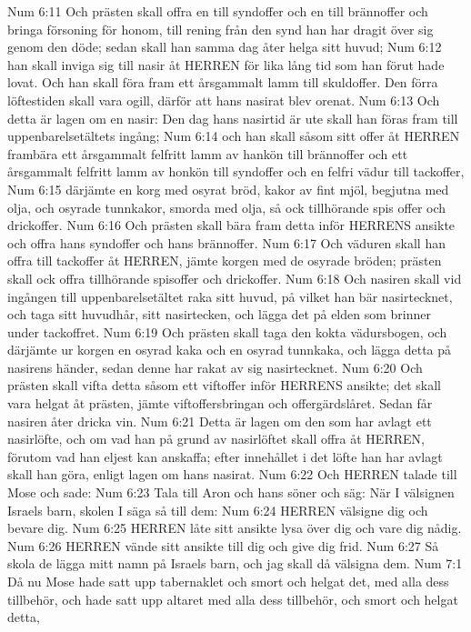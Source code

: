Num 6:11  Och prästen skall offra en till syndoffer och en till brännoffer och bringa försoning för honom, till rening från den synd han har dragit över sig genom den döde; sedan skall han samma dag åter helga sitt huvud;
Num 6:12  han skall inviga sig till nasir åt HERREN för lika lång tid som han förut hade lovat. Och han skall föra fram ett årsgammalt lamm till skuldoffer. Den förra löftestiden skall vara ogill, därför att hans nasirat blev orenat.
Num 6:13  Och detta är lagen om en nasir: Den dag hans nasirtid är ute skall han föras fram till uppenbarelsetältets ingång;
Num 6:14  och han skall såsom sitt offer åt HERREN frambära ett årsgammalt felfritt lamm av hankön till brännoffer och ett årsgammalt felfritt lamm av honkön till syndoffer och en felfri vädur till tackoffer,
Num 6:15  därjämte en korg med osyrat bröd, kakor av fint mjöl, begjutna med olja, och osyrade tunnkakor, smorda med olja, så ock tillhörande spis offer och drickoffer.
Num 6:16  Och prästen skall bära fram detta inför HERRENS ansikte och offra hans syndoffer och hans brännoffer.
Num 6:17  Och väduren skall han offra till tackoffer åt HERREN, jämte korgen med de osyrade bröden; prästen skall ock offra tillhörande spisoffer och drickoffer.
Num 6:18  Och nasiren skall vid ingången till uppenbarelsetältet raka sitt huvud, på vilket han bär nasirtecknet, och taga sitt huvudhår, sitt nasirtecken, och lägga det på elden som brinner under tackoffret.
Num 6:19  Och prästen skall taga den kokta vädursbogen, och därjämte ur korgen en osyrad kaka och en osyrad tunnkaka, och lägga detta på nasirens händer, sedan denne har rakat av sig nasirtecknet.
Num 6:20  Och prästen skall vifta detta såsom ett viftoffer inför HERRENS ansikte; det skall vara helgat åt prästen, jämte viftoffersbringan och offergärdslåret. Sedan får nasiren åter dricka vin.
Num 6:21  Detta är lagen om den som har avlagt ett nasirlöfte, och om vad han på grund av nasirlöftet skall offra åt HERREN, förutom vad han eljest kan anskaffa; efter innehållet i det löfte han har avlagt skall han göra, enligt lagen om hans nasirat.
Num 6:22  Och HERREN talade till Mose och sade:
Num 6:23  Tala till Aron och hans söner och säg: När I välsignen Israels barn, skolen I säga så till dem:
Num 6:24  HERREN välsigne dig och bevare dig.
Num 6:25  HERREN låte sitt ansikte lysa över dig och vare dig nådig.
Num 6:26  HERREN vände sitt ansikte till dig och give dig frid.
Num 6:27  Så skola de lägga mitt namn på Israels barn, och jag skall då välsigna dem.
Num 7:1  Då nu Mose hade satt upp tabernaklet och smort och helgat det, med alla dess tillbehör, och hade satt upp altaret med alla dess tillbehör, och smort och helgat detta,
